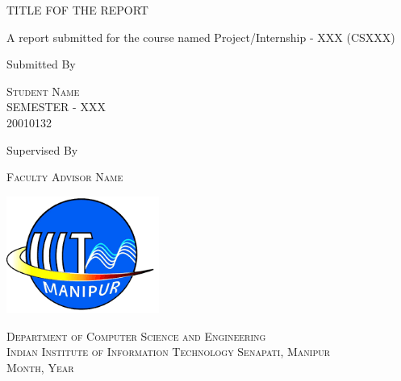 \documentclass[a4paper, 11pt, oneside]{report}
\begin{document}
 	
	\begin{titlepage} 
		
		\centering 
		
		\vspace*{\baselineskip} 
		
		\vspace{0.75\baselineskip}
		
		{\LARGE TITLE FOF THE REPORT}
		
		\vspace{0.75\baselineskip}
		
		\vspace{2\baselineskip}

		A report submitted for the course named Project/Internship - XXX (CSXXX)
		
		\vspace*{7\baselineskip}
		
		Submitted By
		
		\vspace{0.5\baselineskip}
		
		{\scshape\Large Student Name\\ SEMESTER - XXX \\ 20010132}
		
		\vspace{0.5\baselineskip}
		
		Supervised By
		
		\vspace{0.5\baselineskip}
		
		{\scshape\Large Faculty Advisor Name}
		
		\vspace{0.5\baselineskip}
		
		\vfill
		
		\begin{center}
			\includegraphics[width=5cm]{report_file/iiit manipur.png}
		\end{center}
	
	{\scshape\small Department of Computer Science and Engineering\\ Indian Institute of Information Technology Senapati, Manipur \\ Month, Year}
	
\end{titlepage}
\end{document}
